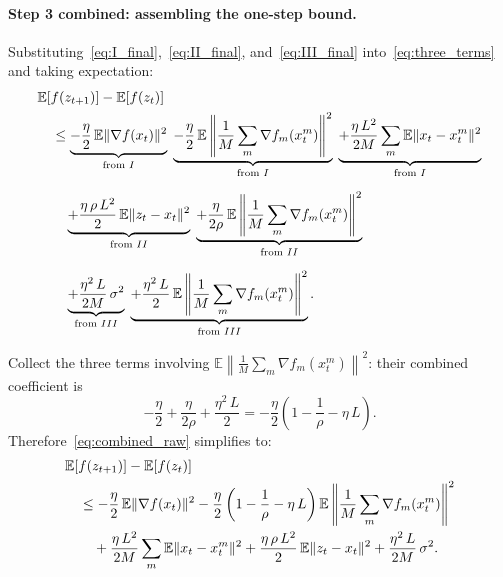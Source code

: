 \documentclass{article}
\begin{document}
\paragraph{Step 3 combined: assembling the one-step bound.}

Substituting~\eqref{eq:I_final},~\eqref{eq:II_final},
and~\eqref{eq:III_final} into~\eqref{eq:three_terms} and taking
expectation:
\begin{align}
&\mathbb{E}[f(z_{t+1})] - \mathbb{E}[f(z_t)] \notag \\
&\quad\leq \underbrace{
  -\frac{\eta}{2}\,\mathbb{E}\|\nabla f(x_t)\|^2
}_{\text{from }I}
\;\underbrace{
  -\frac{\eta}{2}\,\mathbb{E}\left\|\frac{1}{M}\sum_m
    \nabla f_m(x_t^m)\right\|^2
}_{\text{from }I}
\;\underbrace{
  +\frac{\eta\,L^2}{2M}\sum_m\mathbb{E}\|x_t-x_t^m\|^2
}_{\text{from }I} \notag \\[6pt]
&\qquad\underbrace{
  +\frac{\eta\,\rho\,L^2}{2}\,\mathbb{E}\|z_t-x_t\|^2
}_{\text{from }II}
\;\underbrace{
  +\frac{\eta}{2\rho}\,\mathbb{E}\left\|\frac{1}{M}\sum_m
    \nabla f_m(x_t^m)\right\|^2
}_{\text{from }II} \notag \\[6pt]
&\qquad\underbrace{
  +\frac{\eta^2\,L}{2M}\,\sigma^2
}_{\text{from }III}
\;\underbrace{
  +\frac{\eta^2\,L}{2}\,\mathbb{E}\left\|\frac{1}{M}\sum_m
    \nabla f_m(x_t^m)\right\|^2
}_{\text{from }III}.
\label{eq:combined_raw}
\end{align}

Collect the three terms involving
$\mathbb{E}\left\|\frac{1}{M}\sum_m\nabla f_m(x_t^m)\right\|^2$:
their combined coefficient is
\begin{equation}
-\frac{\eta}{2} + \frac{\eta}{2\rho} + \frac{\eta^2\,L}{2}
= -\frac{\eta}{2}\left(1 - \frac{1}{\rho} - \eta\,L\right).
\label{eq:coeff_collect}
\end{equation}
Therefore~\eqref{eq:combined_raw} simplifies to:
\begin{align}
&\mathbb{E}[f(z_{t+1})] - \mathbb{E}[f(z_t)] \notag \\
&\quad\leq -\frac{\eta}{2}\,\mathbb{E}\|\nabla f(x_t)\|^2
  - \frac{\eta}{2}\left(1 - \frac{1}{\rho} - \eta\,L\right)
    \mathbb{E}\left\|\frac{1}{M}\sum_m\nabla f_m(x_t^m)\right\|^2
    \notag \\
&\qquad+ \frac{\eta\,L^2}{2M}\sum_m\mathbb{E}\|x_t - x_t^m\|^2
  + \frac{\eta\,\rho\,L^2}{2}\,\mathbb{E}\|z_t - x_t\|^2
  + \frac{\eta^2\,L}{2M}\,\sigma^2.
\label{eq:one_step}
\end{align}
\end{document}

